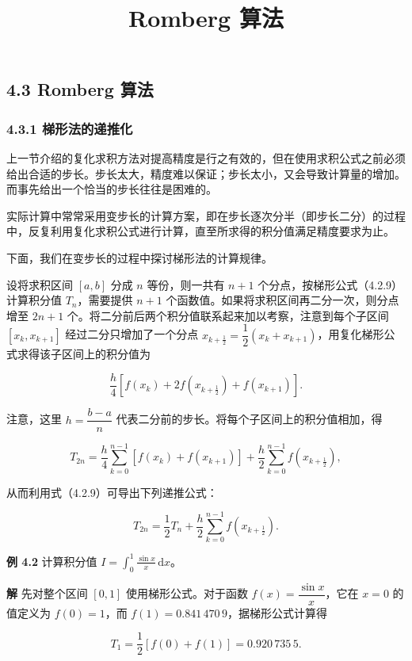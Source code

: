 \documentclass[
  10pt,
  fontset=fandol]{ctexart}
\title{Romberg 算法}
\author{}
\date{}
\begin{document}
\maketitle

\subsection{4.3 Romberg 算法}\label{romberg-ux7b97ux6cd5}

\subsubsection{4.3.1 梯形法的递推化}\label{ux68afux5f62ux6cd5ux7684ux9012ux63a8ux5316}

上一节介绍的复化求积方法对提高精度是行之有效的，但在使用求积公式之前必须给出合适的步长。步长太大，精度难以保证；步长太小，又会导致计算量的增加。而事先给出一个恰当的步长往往是困难的。

实际计算中常常采用变步长的计算方案，即在步长逐次分半（即步长二分）的过程中，反复利用复化求积公式进行计算，直至所求得的积分值满足精度要求为止。

下面，我们在变步长的过程中探讨梯形法的计算规律。

设将求积区间 \([a,b]\) 分成 \(n\) 等份，则一共有 \(n+1\) 个分点，按梯形公式（4.2.9）计算积分值 \(T_n\)，需要提供 \(n+1\) 个函数值。如果将求积区间再二分一次，则分点增至 \(2n+1\) 个。将二分前后两个积分值联系起来加以考察，注意到每个子区间 \([x_k,x_{k+1}]\) 经过二分只增加了一个分点 \(x_{k+\frac12}=\dfrac12(x_k+x_{k+1})\)，用复化梯形公式求得该子区间上的积分值为

\[
\frac h4[f(x_k)+2f(x_{k+\frac12})+f(x_{k+1})].
\]

注意，这里 \(h=\dfrac{b-a}{n}\) 代表二分前的步长。将每个子区间上的积分值相加，得

\[
T_{2n}=\frac h4\sum_{k=0}^{n-1}[f(x_k)+f(x_{k+1})]+\frac h2\sum_{k=0}^{n-1}f(x_{k+\frac12}),
\]

从而利用式（4.2.9）可导出下列递推公式：

\[
T_{2n}=\frac12T_n+\frac h2\sum_{k=0}^{n-1}f(x_{k+\frac12}).
\tag{4.3.1}
\]

\textbf{例 4.2} 计算积分值 \(I=\displaystyle\int_0^1\frac{\sin x}{x}\,\mathrm{d}x\)。

\textbf{解} 先对整个区间 \([0,1]\) 使用梯形公式。对于函数 \(f(x)=\dfrac{\sin x}{x}\)，它在 \(x=0\) 的值定义为 \(f(0)=1\)，而 \(f(1)=0.841\,470\,9\)，据梯形公式计算得

\[
T_1=\frac12[f(0)+f(1)]=0.920\,735\,5.
\]
\end{document}
